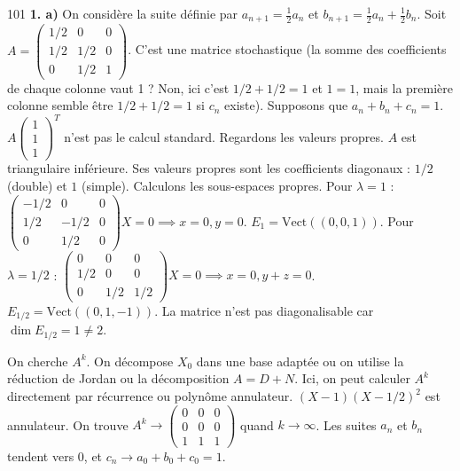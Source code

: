 \begin{correction}{101}
\textbf{1. a)}
On considère la suite définie par $a_{n+1} = \frac{1}{2}a_n$ et $b_{n+1} = \frac{1}{2}a_n + \frac{1}{2}b_n$.
Soit $A = \begin{pmatrix} 1/2 & 0 & 0 \\ 1/2 & 1/2 & 0 \\ 0 & 1/2 & 1 \end{pmatrix}$.
C'est une matrice stochastique (la somme des coefficients de chaque colonne vaut 1 ? Non, ici c'est $1/2+1/2=1$ et $1=1$, mais la première colonne semble être $1/2+1/2=1$ si $c_n$ existe).
Supposons que $a_n+b_n+c_n=1$.
$A \begin{pmatrix} 1 \\ 1 \\ 1 \end{pmatrix}^T$ n'est pas le calcul standard.
Regardons les valeurs propres.
$A$ est triangulaire inférieure. Ses valeurs propres sont les coefficients diagonaux : $1/2$ (double) et $1$ (simple).
Calculons les sous-espaces propres.
Pour $\lambda = 1$ : $\begin{pmatrix} -1/2 & 0 & 0 \\ 1/2 & -1/2 & 0 \\ 0 & 1/2 & 0 \end{pmatrix} X = 0 \implies x=0, y=0$. $E_1 = \text{Vect}((0,0,1))$.
Pour $\lambda = 1/2$ : $\begin{pmatrix} 0 & 0 & 0 \\ 1/2 & 0 & 0 \\ 0 & 1/2 & 1/2 \end{pmatrix} X = 0 \implies x=0, y+z=0$.
$E_{1/2} = \text{Vect}((0, 1, -1))$.
La matrice n'est pas diagonalisable car $\dim E_{1/2} = 1 \ne 2$.

On cherche $A^k$. On décompose $X_0$ dans une base adaptée ou on utilise la réduction de Jordan ou la décomposition $A = D+N$.
Ici, on peut calculer $A^k$ directement par récurrence ou polynôme annulateur.
$(X-1)(X-1/2)^2$ est annulateur.
On trouve $A^k \to \begin{pmatrix} 0 & 0 & 0 \\ 0 & 0 & 0 \\ 1 & 1 & 1 \end{pmatrix}$ quand $k \to \infty$.
Les suites $a_n$ et $b_n$ tendent vers 0, et $c_n \to a_0+b_0+c_0 = 1$.
\end{correction}

